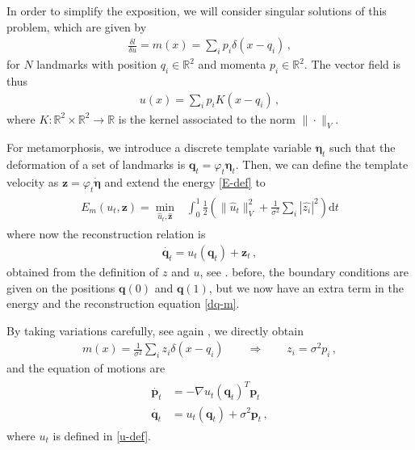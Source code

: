\documentclass[runningheads]{llncs}
\newcommand{\half}{\frac 12}
\newcommand{\norm}[2]{\| #1 \|_{ #2 }}
\newcommand{\vnorm}[1]{\norm{ #1 }{V}}
\newcommand{\diff}[1]{\text{d} #1}
\newcommand{\Rd}{\mathbb{R}^{d}}
\begin{document}


In order to simplify the exposition, we will consider singular solutions of this problem, which are given by 
\begin{align}
  \frac{\delta l}{\delta u} = m(x) = \sum_i p_i \delta(x-q_i)\,, 
\end{align}
for $N$ landmarks with position $q_i\in \mathbb R^2 $ and momenta $p_i \in \mathbb R^2$. 
The vector field is thus 
\begin{align}
  u(x) = \sum_i p_i K(x-q_i)\,, 
  \label{u-def}
\end{align}
where $K:\mathbb R^2\times \mathbb R^2\to \mathbb R$ is the kernel associated to the norm $\|\cdot \|_V$. 

For metamorphosis, we introduce a discrete template variable $\boldsymbol \eta_t$ such that the deformation of a set of landmarks is $\mathbf q_t = \varphi_t \boldsymbol \eta_t$. 
Then, we can define the template velocity as $\mathbf z = \varphi_t \dot {\boldsymbol \eta}$ and extend the energy \eqref{E-def} to 
\begin{align}
  \begin{split}
    E_m(u_t,\mathbf z) =\min_{\hat u_t, \hat{\mathbf z}} & \int_0^1
    \half  \left (\vnorm{\hat u_t}^2 + \frac{1}{\sigma^2} \sum_i |\hat{z_i}|^2\right )\diff{t}
  \end{split}
  \label{E_m-def}
\end{align}
where now the reconstruction relation is 
\begin{align}
    \dot{\mathbf q_t} = u_t (\mathbf q_t) + \mathbf z_t\, , 
    \label{dq-m}
\end{align}
obtained from the definition of $z$ and $u$, see \cite{?}. 
 before, the boundary conditions are given on the positions $\mathbf q(0)$ and $\mathbf q(1)$, but we now have an extra term in the energy and the reconstruction equation \eqref{dq-m}. 

By taking variations carefully, see again \cite{?}, we directly obtain 
\begin{align}
  m(x) = \frac{1}{\sigma^2} \sum_i z_i\delta(x-q_i)\qquad \Rightarrow \qquad  z_i = \sigma^2 p_i\, , 
\end{align}
and the equation of motions are
\begin{align}
  \begin{split}
  \dot{\mathbf p_t} &= - \nabla u_t(\mathbf q_t)^T \mathbf p_t\\ 
  \dot{\mathbf q_t} &= u_t(\mathbf q_t) +  \sigma^2\mathbf p_t \,,
  \end{split}
  \label{eq-m-classic}
\end{align}
where $u_t$ is defined in \eqref{u-def}. 
\end{document}
